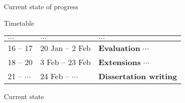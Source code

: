 \documentclass{beamer}
\begin{document}
\begin{frame}{Current state of progress}
    \begin{block}{Timetable}
        \begin{longtable}{m{40pt}m{75pt}m{120pt}}
            $\dots$ & $\dots$ & $\dots$ \\
            \hline
            16 -- 17 & 20 Jan -- 2 Feb & \textbf{Evaluation} $\cdots$ \\
            \hline
            18 -- 20 & 3 Feb -- 23 Feb & \textbf{Extensions} $\cdots$ \\
            \hline
            21 -- $\cdots$ & 24 Feb -- $\cdots$ & \textbf{Dissertation writing} \\
        \end{longtable}
    \end{block}
    \begin{block}{Current state}
    \begin{itemize}


\end{itemize}
\end{block}
\end{frame}
\end{document}
